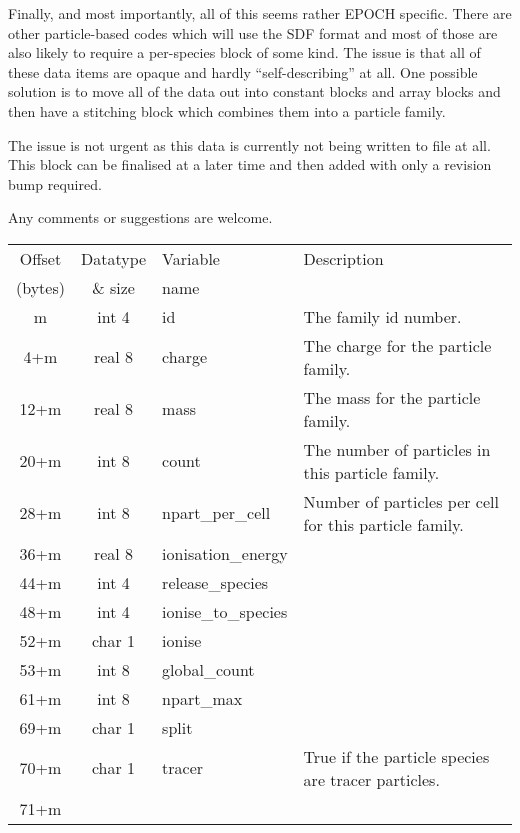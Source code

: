 \documentclass[12pt]{article}
\begin{document}
Finally, and most importantly, all of this seems rather EPOCH specific.
There are other particle-based codes which will use the SDF format and
most of those are also likely to require a per-species block of some kind.
The issue is that all of these data items are opaque and hardly
``self-describing'' at all. One possible solution is to move all of the
data out into constant blocks and array blocks and then have a stitching
block which combines them into a particle family.

The issue is not urgent as this data is currently not being written to
file at all. This block can be finalised at a later time and then added
with only a revision bump required.

Any comments or suggestions are welcome.\\

\begin{center}
\begin{tabularx}{0.9\textwidth}[!hbt]{cclX}
  Offset & Datatype & Variable & Description\\
  (bytes) & \& size & name &
  \\\toprule

  m & int 4 & id & The family id number.
  \\\midrule

  4+m & real 8 & charge & The charge for the particle family.
  \\\midrule

  12+m & real 8 & mass & The mass for the particle family.
  \\\midrule

  20+m & int 8 & count & The number of particles in this particle family.
  \\\midrule

  28+m & int 8 & npart\_per\_cell & Number of particles per cell for this
  particle family.
  \\\midrule

  36+m & real 8 & ionisation\_energy &
  \\\midrule

  44+m & int 4 & release\_species &
  \\\midrule

  48+m & int 4 & ionise\_to\_species &
  \\\midrule

  52+m & char 1 & ionise &
  \\\midrule

  53+m & int 8 & global\_count &
  \\\midrule

  61+m & int 8 & npart\_max &
  \\\midrule

  69+m & char 1 & split &
  \\\midrule

  70+m & char 1 & tracer & True if the particle species are tracer particles.
  \\\midrule

  71+m &
\end{tabularx}
\end{center}\vspace{10pt}
\end{document}
